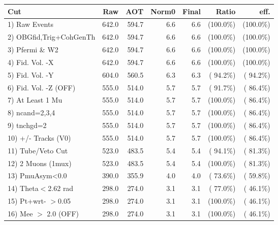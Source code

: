  \begin{table}[h!]\centering
 \begin{tabular}{||l||r|r|r|r|r|r||}
 \hline
 \hline
 Cut & Raw & AOT & Norm0 & Final & Ratio & eff.       \\
 \hline
  1) Raw Events           &        642.0 &        594.7 &          6.6 &          6.6 & (100.0\%) & (100.0\%) \\
  2) OBGfid,Trig+CohGenTh &        642.0 &        594.7 &          6.6 &          6.6 & (100.0\%) & (100.0\%) \\
  3) Pfermi \& W2         &        642.0 &        594.7 &          6.6 &          6.6 & (100.0\%) & (100.0\%) \\
  4) Fid. Vol. -X         &        642.0 &        594.7 &          6.6 &          6.6 & (100.0\%) & (100.0\%) \\
  5) Fid. Vol. -Y         &        604.0 &        560.5 &          6.3 &          6.3 & ( 94.2\%) & ( 94.2\%) \\
  6) Fid. Vol. -Z (OFF)   &        555.0 &        514.0 &          5.7 &          5.7 & ( 91.7\%) & ( 86.4\%) \\
  7) At Least 1 Mu        &        555.0 &        514.0 &          5.7 &          5.7 & (100.0\%) & ( 86.4\%) \\
  8) ncand=2,3,4          &        555.0 &        514.0 &          5.7 &          5.7 & (100.0\%) & ( 86.4\%) \\
  9) tnchgd=2             &        555.0 &        514.0 &          5.7 &          5.7 & (100.0\%) & ( 86.4\%) \\
 10) +/- Tracks (V0)      &        555.0 &        514.0 &          5.7 &          5.7 & (100.0\%) & ( 86.4\%) \\
 11) Tube/Veto Cut        &        523.0 &        483.5 &          5.4 &          5.4 & ( 94.1\%) & ( 81.3\%) \\
 12) 2 Muons (1mux)       &        523.0 &        483.5 &          5.4 &          5.4 & (100.0\%) & ( 81.3\%) \\
 13) PmuAsym<0.0          &        390.0 &        355.9 &          4.0 &          4.0 & ( 73.6\%) & ( 59.8\%) \\
 14) Theta$<$2.62 rad     &        298.0 &        274.0 &          3.1 &          3.1 & ( 77.0\%) & ( 46.1\%) \\
 15) Pt+wrt- $>$0.05      &        298.0 &        274.0 &          3.1 &          3.1 & (100.0\%) & ( 46.1\%) \\
 16) Mee $>$ 2.0  (OFF)   &        298.0 &        274.0 &          3.1 &          3.1 & (100.0\%) & ( 46.1\%) \\

\end{tabular}
\end{table}
